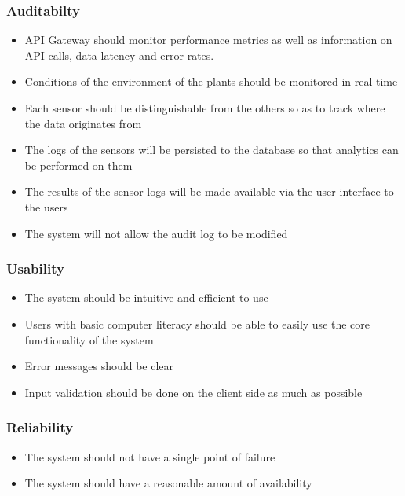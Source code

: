 \documentclass{article}
\begin{document}
\subsubsection{Auditabilty}
	\begin{itemize}
		\item API Gateway should monitor performance metrics as well as information on API calls, data latency and error rates.
		\item Conditions of the environment of the plants should be monitored in real time
		\item Each sensor should be distinguishable from the others so as to track where the data originates from
		\item The logs of the sensors will be persisted to the database so that analytics can be performed on them
		\item The results of the sensor logs will be made available via the user interface to the users
		\item The system will not allow the audit log to be modified
	\end{itemize}
\subsubsection{Usability}
	\begin{itemize}
		\item The system should be intuitive and efficient to use
		\item Users with basic computer literacy should be able to easily use the core functionality of the system
		\item Error messages should be clear
		\item Input validation should be done on the client side as much as possible
	\end{itemize}
\subsubsection{Reliability}
	\begin{itemize}
		\item The system should not have a single point of failure
		\item The system should have a reasonable amount of availability
	\end{itemize}
\end{document}

